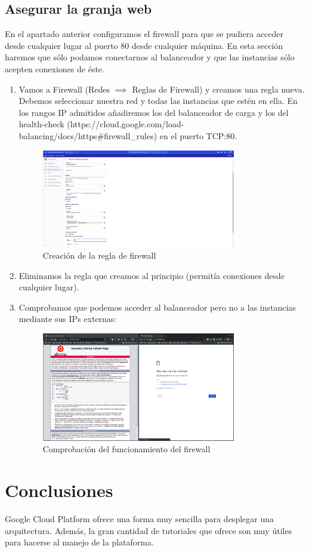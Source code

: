\documentclass[12pt,spanish]{article}
\begin{document}
\subsection{Asegurar la granja web}
En el apartado anterior configuramos el firewall para que se pudiera acceder desde cualquier lugar al puerto 80 desde cualquier máquina. En esta sección haremos que sólo podamos conectarnos al balanceador y que las instancias sólo acepten conexiones de éste.
\begin{enumerate}
	\item Vamos a Firewall (Redes $\implies$ Reglas de Firewall) y creamos una regla nueva. Debemos seleccionar nuestra red y todas las instancias que estén en ella. En los rangos IP admitidos añadiremos los del balanceador de carga y los del health-check (https://cloud.google.com/load-balancing/docs/https\#firewall\_rules) en el puerto TCP:80.
	\begin{figure}[H]
		\centering
		\includegraphics[width=0.8\textwidth]{project/firewall_balancer.png}
		\caption{Creación de la regla de firewall}
	\end{figure}
	\item Eliminamos la regla que creamos al principio (permitía conexiones desde cualquier lugar).
	\item Comprobamos que podemos acceder al balanceador pero no a las instancias mediante sus IPs externas:
	\begin{figure}[H]
		\centering
		\includegraphics[width=0.8\textwidth]{project/new_firewall_ok.png}
		\caption{Comprobación del funcionamiento del firewall}
	\end{figure}
\end{enumerate}

\section{Conclusiones}

Google Cloud Platform ofrece una forma muy sencilla para desplegar una arquitectura. Además, la gran cantidad de tutoriales que ofrece son muy útiles para hacerse al manejo de la plataforma.
\newpage

\nocite{*}

\end{document}
